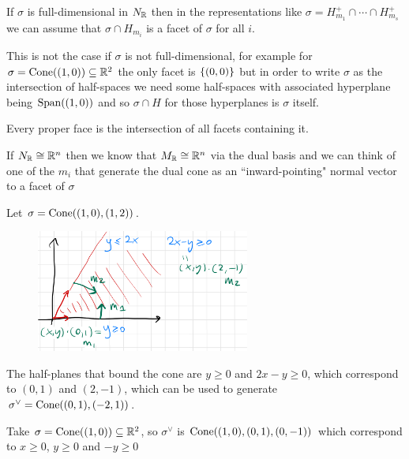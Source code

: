 \begin{fact}
If $\sigma$ is full-dimensional in $N_{\mathbb{R}}$ then in the representations like $\sigma=H_{m_1}^+\cap\cdots\cap H_{m_s}^+$ we can assume that $\sigma\cap H_{m_i}$ is a facet of $\sigma$ for all $i$.
\end{fact}

\begin{remark}
This is not the case if $\sigma$ is not full-dimensional, for example for $\sigma=\operatorname{Cone}((1,0))\subseteq \mathbb{R}^2$ the only facet is $\left\{{(0,0)}\right\}$ but in order to write $\sigma$ as the intersection of half-spaces we need some half-spaces with associated hyperplane being $\operatorname{Span}((1,0))$ and so $\sigma\cap H$ for those hyperplanes is $\sigma$ itself.
\end{remark}


\begin{fact}
Every proper face is the intersection of all facets containing it.
\end{fact}


\begin{remark}
If $N_{\mathbb{R}}\cong \mathbb{R}^n$ then we know that $M_{\mathbb{R}}\cong \mathbb{R}^n$ via the dual basis and we can think of one of the $m_i$ that generate the dual cone as an ``inward-pointing" normal vector to a facet of $\sigma$
\end{remark}


\begin{example}
Let $\sigma=\operatorname{Cone}((1,0),(1,2))$. 
\begin{figure}[!htb]
	\centering
	\includegraphics[width=7cm]{Images/Inward-facing-normals-for-dual-cone.png}
\end{figure}

\noindent
The half-planes that bound the cone are $y\geq 0$ and $2x-y\geq0$, which correspond to $(0,1)$ and $(2,-1)$, which can be used to generate $\sigma^\vee=\operatorname{Cone}((0,1),(-2,1))$.
\end{example}


\begin{example}
Take $\sigma=\operatorname{Cone}((1,0))\subseteq \mathbb{R}^2$, so $\sigma^\vee$ is $\operatorname{Cone}((1,0),(0,1),(0,-1))$ which correspond to $x\geq 0$, $y\geq 0$ and $-y\geq 0$
\end{example}

